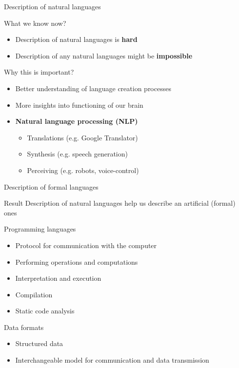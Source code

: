 \documentclass{beamer}
\begin{document}
\begin{frame}{Description of natural languages}

\begin{block}{What we know now?}
\begin{itemize}
\item Description of natural languages is \textbf{hard}
\item Description of any natural languages might be \textbf{impossible}
\end{itemize}
\end{block}

\begin{block}{Why this is important?}
\begin{itemize}
\item Better understanding of language creation processes
\item More insights into functioning of our brain
\item \textbf{Natural language processing (NLP)}
\begin{itemize}
\item Translations (e.g. Google Translator)
\item Synthesis (e.g. speech generation)
\item Perceiving (e.g. robots, voice-control)
\end{itemize}
\end{itemize}
\end{block}

\end{frame}

\begin{frame}{Description of formal languages}

\begin{alertblock}{Result}
Description of natural languages help us describe an artificial (formal) ones
\end{alertblock}

\begin{block}{Programming languages}
\begin{itemize}
\item Protocol for communication with the computer
\item Performing operations and computations
\item Interpretation and execution
\item Compilation
\item Static code analysis
\end{itemize}
\end{block}

\begin{block}{Data formats}
\begin{itemize}
\item Structured data
\item Interchangeable model for communication and data transmission
\end{itemize}
\end{block}

\end{frame}
\end{document}
